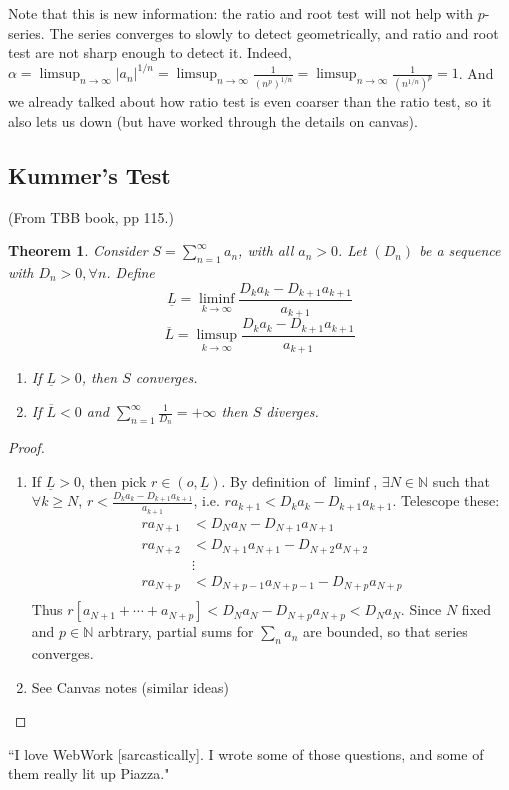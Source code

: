 \documentclass{article}
\theoremstyle{plain}
\newtheorem{theorem}{Theorem}
\theoremstyle{remark}
\newcommand{\N}{{\mathbb N}}
\begin{document}
Note that this is new information:
the ratio and root test will not help with $p$-series.
The series converges to slowly to detect geometrically,
and ratio and root test are not sharp enough to detect it.
Indeed, $\alpha = \limsup_{n\to \infty}|a_n|^{1/n} = \limsup_{n\to\infty}\frac{1}{(n^p)^{1/n}}
= \limsup_{n\to\infty} \frac{1}{(n^{1/n})^p} = 1$.
And we already talked about how ratio test is even coarser than
the ratio test, so it also lets us down (but have worked through the details on canvas).

\subsection{Kummer's Test}
(From TBB book, pp 115.)
\begin{theorem}
	Consider $S = \sum_{n=1}^\infty a_n$,
	with all $a_n > 0$.
	Let $(D_n)$ be a sequence with $D_n > 0, \forall n$.
	Define
	\[
		\underline{L} = \liminf_{k\to\infty} \frac{D_ka_k - D_{k+1}a_{k+1}}{a_{k+1}}
	\]
	\[
		\overline{L} = \limsup_{k\to\infty} \frac{D_ka_k - D_{k+1}a_{k+1}}{a_{k+1}}
	\]
	\begin{enumerate}
		\item If $\underline{L} > 0$, then $S$ converges.
		\item If $\overline{L} < 0$ and $\sum_{n=1}^\infty \frac{1}{D_n} = +\infty$
			then $S$ diverges.
	\end{enumerate}
\end{theorem}
\begin{proof}
\begin{enumerate}
	\item If $\underline{L} > 0$, then pick $r \in (o,\underline{L})$.
		By definition of $\liminf$, $\exists N \in \N$ such that
		$\forall k \geq N$, $r < \frac{D_ka_k - D_{k+1}a_{k+1}}{a_{k+1}}$,
		i.e. $ra_{k+1} < D_ka_k - D_{k+1}a_{k+1}$.
		Telescope these:
		\begin{align*}
			ra_{N+1} &< D_Na_N - D_{N+1}a_{N+1}\\
			ra_{N+2} &< D_{N+1}a_{N+1} - D_{N+2}a_{N+2}\\
					 &\vdots\\
			ra_{N+p} &< D_{N+p-1}a_{N+p-1} - D_{N+p}a_{N+p}\\
		\end{align*}
		Thus $r\left[a_{N+1} + \cdots + a_{N+p}\right] < D_Na_N - D_{N+p}a_{N+p} < D_Na_N$.
		Since $N$ fixed and $p \in \N$ arbtrary,
		partial sums for $\sum_n a_n$ are bounded, so that series converges.
	\item See Canvas notes (similar ideas)
\end{enumerate}
\end{proof}
``I love WebWork [sarcastically]. I wrote some of those questions,
and some of them really lit up Piazza."
\end{document}
